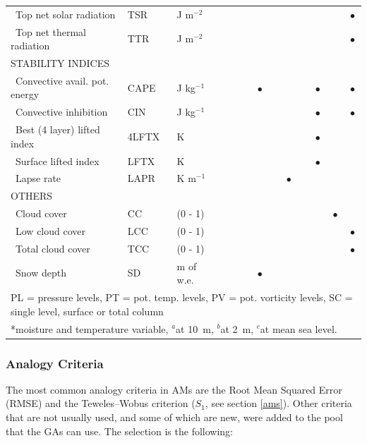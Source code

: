 \documentclass[draft]{agujournal2019}
\begin{document}
\begin{table}[!htbp]
{\begin{tabular}{lll|cccc|cccc|cc}
		\ Top net solar radiation & TSR & J m$^{-2}$ &  &  &  &  &  &  &  & & & $\bullet$ \\
		\ Top net thermal radiation & TTR & J m$^{-2}$ &  &  &  &  &  &  &  & & & $\bullet$ \\
		\hline
		\multicolumn{3}{l|}{\uppercase{Stability indices}} & & & & & & & & & & \\
		\ Convective avail. pot. energy & CAPE & J kg$^{-1}$ &  &  &  & $\bullet$ &  &  &  & $\bullet$ & & $\bullet$ \\
		\ Convective inhibition & CIN & J kg$^{-1}$ &  &  &  &  &  &  &  & $\bullet$ & & $\bullet$ \\
		\ Best (4 layer) lifted index & 4LFTX & K &  &  &  &  &  &  &  & $\bullet$ & & \\
		\ Surface lifted index & LFTX & K &  &  &  &  &  &  &  & $\bullet$ & & \\
		\ Lapse rate & LAPR & K m$^{-1}$ &  &  &  &  &  & $\bullet$ &  &  & & \\
		\hline
		\multicolumn{3}{l|}{\uppercase{Others}} & & & & & & & & & & \\
		\ Cloud cover & CC & (0 - 1) &  &  &  &  &  &  &  &  & $\bullet$ & \\
		\ Low cloud cover & LCC & (0 - 1) &  &  &  &  &  &  &  &  & & $\bullet$ \\
		\ Total cloud cover & TCC & (0 - 1) &  &  &  &  &  &  &  &  &  & $\bullet$ \\
		\ Snow depth & SD & m of w.e. &  &  &  & $\bullet$ &  &  &  &  & & \\
		\hline
		\multicolumn{13}{l}{PL = pressure levels, PT = pot. temp. levels, PV = pot. vorticity levels, SC = single level, surface or total column} \\
		\multicolumn{13}{l}{*moisture and temperature variable, $^{a}$at 10~m, $^{b}$at 2~m, $^{c}$at mean sea level.}\\
		\hline 
	\end{tabular}}
	\label{list_variables}
\end{table}


\subsubsection{Analogy Criteria}
\label{criteria}

The most common analogy criteria in AMs are the Root Mean Squared Error (RMSE) and the Teweles--Wobus criterion ($S_{1}$, see section \ref{ams}). Other criteria that are not usually used, and some of which are new, were added to the pool that the GAs can use. The selection is the following:
\end{document}
